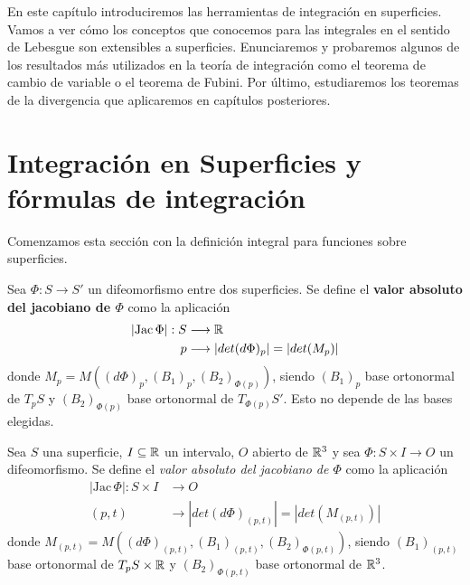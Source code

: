 \label{chapter:surfacesintegration}
En este capítulo introduciremos las herramientas de integración en superficies. Vamos a ver cómo los conceptos que conocemos para las integrales en el sentido de Lebesgue son extensibles a superficies. Enunciaremos y probaremos algunos de los resultados más utilizados en la teoría de integración como el teorema de cambio de variable o el teorema de Fubini. Por último, estudiaremos los teoremas de la divergencia que aplicaremos en capítulos posteriores.

\section{Integración en Superficies y fórmulas de integración}

Comenzamos esta sección con la definición integral para funciones sobre superficies.

\begin{definition}
Sea $\Phi: S \longrightarrow S'$ un difeomorfismo entre dos superficies. Se define el \textbf{valor absoluto del jacobiano de $\Phi$} como la aplicación
\begin{align*}
    |\text{Jac} \, \Phi|: S &\longrightarrow \mathbb{R} \\
    p &\longrightarrow |det(d\Phi)_p| = |det(M_p)|
\end{align*}
%
donde $M_p=M((d\Phi)_p, (B_1)_p, (B_2)_{\Phi(p)})$, siendo $(B_1)_p$ base ortonormal de $T_pS$ y $(B_2)_{\Phi(p)}$ base ortonormal de $T_{\Phi(p)}S'$. Esto no depende de las bases elegidas.
\end{definition}

\begin{definition}
Sea $S$ una superficie, $I \subseteq \mathbb{R}$ un intervalo, $O$ abierto de $\mathbb{R}^3$ y sea $\Phi: S \times I \longrightarrow O$ un difeomorfismo. Se define el \textit{valor absoluto del jacobiano de $\Phi$} como la aplicación
\begin{align*}
    |\text{Jac} \, \Phi|: S \times I &\longrightarrow O \\
    (p,t) &\longrightarrow |det(d\Phi)_{(p,t)}| = |det(M_{(p,t)})|
\end{align*}
%
donde $M_{(p,t)}=M((d\Phi)_{(p,t)}, (B_1)_{(p,t)}, (B_2)_{\Phi(p,t)})$, siendo $(B_1)_{(p,t)}$ base ortonormal de $T_pS \times \mathbb{R}$ y $(B_2)_{\Phi(p,t)}$ base ortonormal de $\mathbb{R}^3$.
\end{definition}

